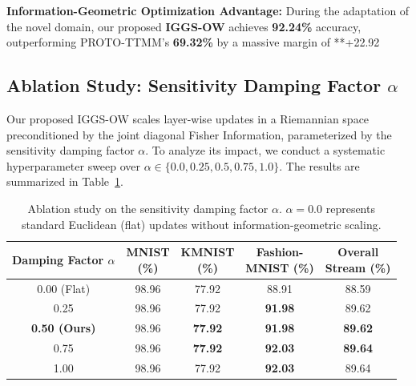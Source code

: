 \documentclass{article}
\theoremstyle{plain}
\theoremstyle{definition}
\theoremstyle{remark}
\begin{document}
\textbf{Information-Geometric Optimization Advantage:} During the adaptation of the novel domain, our proposed \textbf{IGGS-OW} achieves \textbf{92.24\%} accuracy, outperforming PROTO-TTMM's \textbf{69.32\%} by a massive margin of **+22.92%

\subsection{Ablation Study: Sensitivity Damping Factor \texorpdfstring{$\alpha$}{alpha}}
Our proposed IGGS-OW scales layer-wise updates in a Riemannian space preconditioned by the joint diagonal Fisher Information, parameterized by the sensitivity damping factor $\alpha$. To analyze its impact, we conduct a systematic hyperparameter sweep over $\alpha \in \{0.0, 0.25, 0.5, 0.75, 1.0\}$. The results are summarized in Table~\ref{tab:ablation}.

\begin{table}[h]
\caption{Ablation study on the sensitivity damping factor $\alpha$. $\alpha = 0.0$ represents standard Euclidean (flat) updates without information-geometric scaling.}
\label{tab:ablation}
\begin{center}
\begin{footnotesize}
\setlength{\tabcolsep}{2pt}
\begin{tabular}{ccccc}
\toprule
\shortstack[c]{\textbf{Damping}\\\textbf{Factor } $\alpha$} & \shortstack[c]{\textbf{MNIST}\\\textbf{(\%)}} & \shortstack[c]{\textbf{KMNIST}\\\textbf{(\%)}} & \shortstack[c]{\textbf{Fashion-}\\\textbf{MNIST (\%)}} & \shortstack[c]{\textbf{Overall}\\\textbf{Stream (\%)}} \\
\midrule
0.00 (Flat) & 98.96 & 77.92 & 88.91 & 88.59 \\
0.25 & 98.96 & 77.92 & \textbf{91.98} & 89.62 \\
\textbf{0.50 (Ours)} & 98.96 & \textbf{77.92} & \textbf{91.98} & \textbf{89.62} \\
0.75 & 98.96 & \textbf{77.92} & \textbf{92.03} & \textbf{89.64} \\
1.00 & 98.96 & 77.92 & \textbf{92.03} & 89.64 \\
\bottomrule
\end{tabular}
\end{footnotesize}
\end{center}
\end{table}
\end{document}
